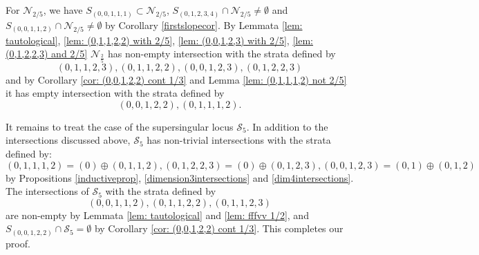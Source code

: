\documentclass[11pt,table]{amsart}
\numberwithin{equation}{section}
\theoremstyle{definition}
\theoremstyle{remark}
\theoremstyle{remark}
\begin{document}
For $\mathcal{N}_{2/5}$, we have $S_{(0,0,1,1,1)} \subset \mathcal{N}_{2/5}$, $S_{(0,1,2,3,4)} \cap \mathcal{N}_{2/5} \ne \emptyset$ and $S_{(0,0,1,1,2)} \cap \mathcal{N}_{2/5} \ne \emptyset$ by Corollary \ref{firstslopecor}. By Lemmata \ref{lem: tautological}, \ref{lem: (0,1,1,2,2) with  2/5}, \ref{lem: (0,0,1,2,3) with 2/5}, \ref{lem: (0,1,2,2,3) and 2/5} $\mathcal{N}_{\frac{2}{5}}$ has non-empty intersection with the strata defined by
$$(0,1,1,2,3), (0,1,1,2,2), (0,0,1,2,3),(0,1,2,2,3) $$
and by Corollary \ref{cor: (0,0,1,2,2) cont 1/3}  and Lemma \ref{lem: (0,1,1,1,2) not 2/5} it has empty intersection with the strata defined by 
$$ (0,0,1,2,2), (0,1,1,1,2).$$

It remains to treat the case of the supersingular locus $\mathcal{S}_5$. In addition to the intersections discussed above, $\mathcal{S}_5$ has non-trivial intersections with the strata defined by:
$$(0,1,1,1,2) = (0) \oplus (0,1,1,2), (0,1,2,2,3) = (0) \oplus (0,1,2,3),(0,0,1,2,3) = (0,1) \oplus (0,1,2)$$
by Propositions \ref{inductiveprop}, \ref{dimension3intersections} and \ref{dim4intersections}. The intersections of $\mathcal{S}_5$ with the strata defined by 
$$(0,0,1,1,2), (0,1,1,2,2) ,(0,1,1,2,3) $$
are non-empty by Lemmata \ref{lem: tautological} and \ref{lem: fffvv 1/2}, and $ S_{(0,0,1,2,2)} \cap \mathcal{S}_5 = \emptyset$ by Corollary \ref{cor: (0,0,1,2,2) cont 1/3}. This completes our proof.




\end{document}
